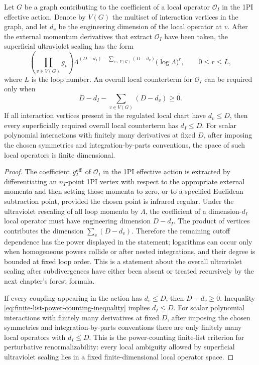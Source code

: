 \begin{lemma}
\label{lem:power-counting-finite-list-criterion}
Let \(G\) be a graph contributing to the coefficient of a local operator
\(\mathcal O_I\) in the 1PI effective action.  Denote by \(V(G)\) the multiset
of interaction vertices in the graph, and let \(d_v\) be the engineering
dimension of the local operator at \(v\).  After the external momentum
derivatives that extract \(\mathcal O_I\) have been taken, the superficial
ultraviolet scaling has the form
\[
  \left(\prod_{v\in V(G)}g_v\right)
  \Lambda^{
    (D-d_I)-\sum_{v\in V(G)}(D-d_v)
  }
  \bigl(\log\Lambda\bigr)^{r},
  \qquad
  0\le r\le L,
\]
where \(L\) is the loop number.  An overall local counterterm for
\(\mathcal O_I\) can be required only when
\begin{equation}
  D-d_I-\sum_{v\in V(G)}(D-d_v)\ge0 .
  \label{eq:finite-list-power-counting-inequality}
\end{equation}
If all interaction vertices present in the regulated local chart have
\(d_v\le D\), then every superficially required overall local counterterm has
\(d_I\le D\).  For scalar polynomial interactions with finitely many
derivatives at fixed \(D\), after imposing the chosen symmetries and
integration-by-parts conventions, the space of such local operators is finite
dimensional.
\end{lemma}

\begin{proof}
The coefficient \(g_I^{\rm eff}\) of \(\mathcal O_I\) in the 1PI effective
action is extracted by differentiating an \(n_I\)-point 1PI vertex with
respect to the appropriate external momenta and then setting those momenta to
zero, or to a specified Euclidean subtraction point, provided the chosen point
is infrared regular.  Under the ultraviolet rescaling of all loop momenta by
\(\Lambda\), the coefficient of a dimension-\(d_I\) local operator must have
engineering dimension \(D-d_I\).  The product of vertices contributes the
dimension \(\sum_v(D-d_v)\).  Therefore the remaining cutoff dependence has
the power displayed in the statement; logarithms can occur only when
homogeneous powers collide or after nested integrations, and their degree is
bounded at fixed loop order.  This is a statement about the overall
ultraviolet scaling after subdivergences have either been absent or treated
recursively by the next chapter's forest formula.

If every coupling appearing in the action has \(d_v\le D\), then
\(D-d_v\ge0\).  Inequality
\eqref{eq:finite-list-power-counting-inequality} implies \(d_I\le D\).  For
scalar
polynomial interactions with finitely many derivatives at fixed \(D\), after
imposing the chosen symmetries and integration-by-parts conventions there are
only finitely many local operators with \(d_I\le D\).  This is the
power-counting finite-list criterion for perturbative renormalizability: every
local ambiguity allowed by superficial ultraviolet scaling lies in a fixed
finite-dimensional local operator space.
\end{proof}

